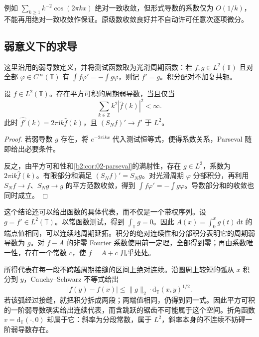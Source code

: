例如 \(\sum_{k\geq1}k^{-2}\cos(2\pi kx)\) 绝对一致收敛，但形式导数的系数仅为 \(O(1/k)\)，不能再用绝对一致收敛作保证。原级数收敛良好并不自动许可任意次逐项微分。

\subsection{弱意义下的求导}
\label{b2:subsec:020603}

这里沿用的弱导数定义，并将测试函数取为光滑周期函数：若 \(f,g\in L^2(\mathbb T)\) 且对全部 \(\varphi\in C^\infty(\mathbb T)\) 有 \(\int f\varphi'=-\int g\varphi\)，则记 \(f'=g\)。积分配对不加复共轭。

\begin{theorem}\label{b2:thm:02-weak-derivative}
设 \(f\in L^2(\mathbb T)\)。存在平方可积的周期弱导数，当且仅当
\[
 \sum_{k\in\mathbb Z}k^2|\widehat f(k)|^2<\infty.
\]
此时 \(\widehat {f'}(k)=2\pi\mathrm{i}k\widehat f(k)\)，且 \((S_Nf)'\to f'\) 于 \(L^2\)。
\end{theorem}
\begin{proof}
若弱导数 \(g\) 存在，将 \(e^{-2\pi\mathrm{i}kx}\) 代入测试恒等式，便得系数关系，Parseval 随即给出必要条件。

反之，由平方可和性和\cref{b2:cor:02-parseval}的满射性，存在 \(g\in L^2\)，系数为 \(2\pi\mathrm{i}k\widehat f(k)\)。有限部分和满足 \((S_Nf)'=S_Ng\)。对光滑周期 \(\varphi\) 分部积分，再利用 \(S_Nf\to f\)、\(S_Ng\to g\) 的平方范数收敛，得到 \(\int f\varphi'=-\int g\varphi\)。导数部分和的收敛也同时成立。
\end{proof}

这个结论还可以给出函数的具体代表，而不仅是一个带权序列。设 \(g=f'\in L^2(\mathbb T)\)。以常函数测试，得到 \(\int_{\mathbb T}g=0\)。因此 \(A(x)=\int_0^x g(t)\,\mathrm dt\) 的端点值相同，可以连续地周期延拓。积分的绝对连续性和分部积分表明它的周期弱导数为 \(g\)。对 \(f-A\) 的非零 Fourier 系数使用前一定理，全部得到零；再由系数唯一性，存在一个常数 \(c\)，使 \(f=A+c\) 几乎处处。

\ProseParagraphBreak

所得代表在每一段不跨越周期接缝的区间上绝对连续。沿圆周上较短的弧从 \(x\) 积分到 \(y\)，Cauchy--Schwarz 不等式给出
\[
 |f(y)-f(x)|\leq\|g\|_2\cdot\mathrm d_{\mathbb T}(x,y)^{1/2}.
\]
若该弧经过接缝，就把积分拆成两段；两端值相同，仍得到同一式。因此平方可积的一阶弱导数确实给出连续代表，而含跳跃的锯齿不可能属于这个空间。折角函数 \(v=\mathrm d_{\mathbb T}(\cdot,0)\) 却属于它：斜率为分段常数，属于 \(L^2\)，斜率本身的不连续不妨碍一阶弱导数存在。

